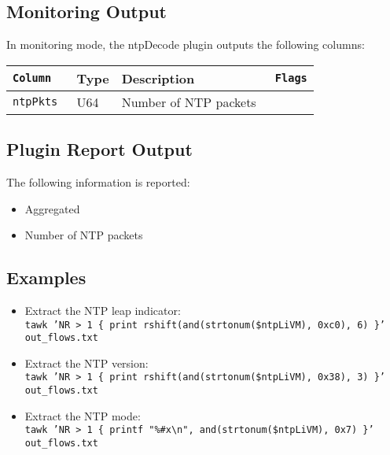 \documentclass[documentation]{subfiles}
\begin{document}
\subsection{Monitoring Output}
In monitoring mode, the ntpDecode plugin outputs the following columns:
\begin{longtable}{>{\tt}lll>{\tt\small}l}
    \toprule
    {\bf Column} & {\bf Type} & {\bf Description} & {\bf Flags}\\
    \midrule\endhead%
    ntpPkts & U64 & Number of NTP packets & \\
    \bottomrule
\end{longtable}

\subsection{Plugin Report Output}
The following information is reported:
\begin{itemize}
    \item Aggregated {\tt{}}
    \item Number of NTP packets
\end{itemize}

\subsection{Examples}\label{ntp:examples}
\begin{itemize}
    \item Extract the NTP leap indicator:\\
          {\tt tawk 'NR > 1 \{ print rshift(and(strtonum(\$ntpLiVM), 0xc0), 6) \}' out\_flows.txt}
    \item Extract the NTP version:\\
          {\tt tawk 'NR > 1 \{ print rshift(and(strtonum(\$ntpLiVM), 0x38), 3) \}' out\_flows.txt}
    \item Extract the NTP mode:\\
            {\tt tawk 'NR > 1 \{ printf "\%\#x\textbackslash{}n", and(strtonum(\$ntpLiVM), 0x7) \}' out\_flows.txt}
\end{itemize}
\end{document}
